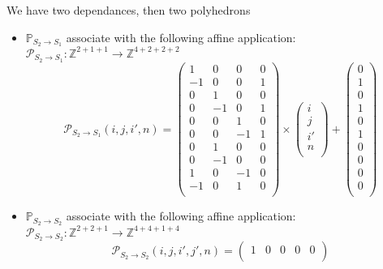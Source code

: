 We have two dependances, then two polyhedrons 
\begin{itemize}
	\item $\mathbb{P}_{S_{2} \rightarrow S_{1}}$ associate with the following affine application:\\
	$\mathcal{P}_{S_{2} \rightarrow S_{1}}: \mathbb{Z}^{2 + 1 + 1} \rightarrow  \mathbb{Z}^{4 + 2 + 2 + 2} $\\
	$$\mathcal{P}_{S_{2} \rightarrow S_{1}}(i, j, i', n) = 
	\begin{pmatrix}
		1  & 0  & 0  & 0 \\
		-1 & 0  & 0  & 1 \\
		0  & 1  & 0  & 0 \\
		0  & -1 & 0  & 1 \\
		0  & 0  & 1  & 0 \\
		0  & 0  & -1 & 1 \\
		0  & 1  & 0  & 0 \\
		0  & -1 & 0  & 0 \\
		1  & 0  & -1 & 0 \\
		-1 & 0  & 1  & 0 \\
	\end{pmatrix}
	\times
	\begin{pmatrix}
		i  \\
		j  \\
		i' \\
		n  \\
	\end{pmatrix}
	+
	\begin{pmatrix}
		0 \\
		1 \\
		0 \\
		1 \\
		0 \\
		1 \\
		0 \\
		0 \\
		0 \\
		0 \\
	\end{pmatrix}$$
	\item $\mathbb{P}_{S_{2} \rightarrow S_{2}}$ associate with the following affine application:\\
	$\mathcal{P}_{S_{2} \rightarrow S_{2}}: \mathbb{Z}^{2 + 2 + 1} \rightarrow  \mathbb{Z}^{4 + 4 + 1 + 4} $\\
	$$\mathcal{P}_{S_{2} \rightarrow S_{2}}(i, j, i', j', n) = 
	\begin{pmatrix}
		1  & 0  & 0  & 0  & 0  \\

\end{pmatrix}$$
\end{itemize}
